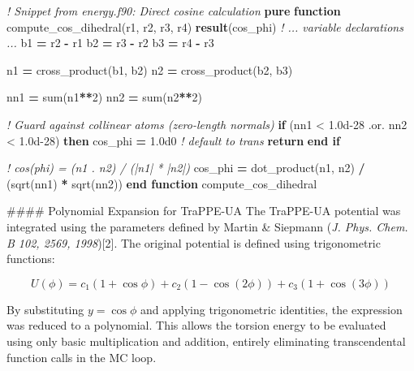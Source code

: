 \documentclass[
]{article}
\newenvironment{Shaded}{}{}
\newcommand{\BuiltInTok}[1]{\textcolor[rgb]{0.00,0.50,0.00}{#1}}
\newcommand{\CommentTok}[1]{\textcolor[rgb]{0.38,0.63,0.69}{\textit{#1}}}
\newcommand{\DecValTok}[1]{\textcolor[rgb]{0.25,0.63,0.44}{#1}}
\newcommand{\FloatTok}[1]{\textcolor[rgb]{0.25,0.63,0.44}{#1}}
\newcommand{\FunctionTok}[1]{\textcolor[rgb]{0.02,0.16,0.49}{#1}}
\newcommand{\KeywordTok}[1]{\textcolor[rgb]{0.00,0.44,0.13}{\textbf{#1}}}
\newcommand{\NormalTok}[1]{#1}
\newcommand{\OperatorTok}[1]{\textcolor[rgb]{0.40,0.40,0.40}{#1}}
\begin{document}
\begin{Shaded}
\begin{Highlighting}[]
\CommentTok{! Snippet from energy.f90: Direct cosine calculation}
\KeywordTok{pure} \KeywordTok{function}\NormalTok{ compute\_cos\_dihedral(r1, r2, r3, r4) }\KeywordTok{result}\NormalTok{(cos\_phi)}
  \CommentTok{! ... variable declarations ...}
\NormalTok{  b1 }\KeywordTok{=}\NormalTok{ r2 }\KeywordTok{{-}}\NormalTok{ r1}
\NormalTok{  b2 }\KeywordTok{=}\NormalTok{ r3 }\KeywordTok{{-}}\NormalTok{ r2}
\NormalTok{  b3 }\KeywordTok{=}\NormalTok{ r4 }\KeywordTok{{-}}\NormalTok{ r3}

\NormalTok{  n1 }\KeywordTok{=}\NormalTok{ cross\_product(b1, b2)}
\NormalTok{  n2 }\KeywordTok{=}\NormalTok{ cross\_product(b2, b3)}

\NormalTok{  nn1 }\KeywordTok{=} \FunctionTok{sum}\NormalTok{(n1}\KeywordTok{**}\DecValTok{2}\NormalTok{)}
\NormalTok{  nn2 }\KeywordTok{=} \FunctionTok{sum}\NormalTok{(n2}\KeywordTok{**}\DecValTok{2}\NormalTok{)}

  \CommentTok{! Guard against collinear atoms (zero{-}length normals)}
  \KeywordTok{if}\NormalTok{ (nn1 }\OperatorTok{\textless{}} \FloatTok{1.0d{-}28} \OperatorTok{.or.}\NormalTok{ nn2 }\OperatorTok{\textless{}} \FloatTok{1.0d{-}28}\NormalTok{) }\KeywordTok{then}
\NormalTok{    cos\_phi }\KeywordTok{=} \FloatTok{1.0d0}   \CommentTok{! default to trans}
    \KeywordTok{return}
  \KeywordTok{end if}

  \CommentTok{! cos(phi) = (n1 . n2) / (|n1| * |n2|)}
\NormalTok{  cos\_phi }\KeywordTok{=} \FunctionTok{dot\_product}\NormalTok{(n1, n2) }\KeywordTok{/}\NormalTok{ (}\BuiltInTok{sqrt}\NormalTok{(nn1) }\KeywordTok{*} \BuiltInTok{sqrt}\NormalTok{(nn2))}
\KeywordTok{end function}\NormalTok{ compute\_cos\_dihedral}
\end{Highlighting}
\end{Shaded}

\#\#\#\# Polynomial Expansion for TraPPE-UA The TraPPE-UA potential was
integrated using the parameters defined by Martin \& Siepmann (\emph{J.
Phys. Chem. B 102, 2569, 1998}){[}2{]}. The original potential is
defined using trigonometric functions:

\[U(\phi) = c_1(1 + \cos\phi) + c_2(1 - \cos(2\phi)) + c_3(1 + \cos(3\phi))\]

By substituting \(y = \cos\phi\) and applying trigonometric identities,
the expression was reduced to a polynomial. This allows the torsion
energy to be evaluated using only basic multiplication and addition,
entirely eliminating transcendental function calls in the MC loop.
\end{document}
